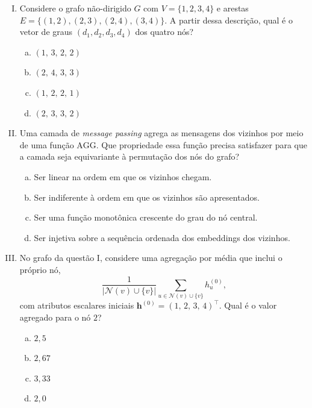 \documentclass{dlproblemset}
\begin{document}
\begin{enumerate}[I)]

    \item Considere o grafo não-dirigido $G$ com $V = \{1,2,3,4\}$ e arestas $E = \{(1,2),(2,3),(2,4),(3,4)\}$. A partir dessa descrição, qual é o vetor de graus $(d_1, d_2, d_3, d_4)$ dos quatro nós?
    \begin{enumerate}[(a)]
        \item $(1,\, 3,\, 2,\, 2)$
        \item $(2,\, 4,\, 3,\, 3)$
        \item $(1,\, 2,\, 2,\, 1)$
        \item $(2,\, 3,\, 3,\, 2)$
    \end{enumerate}

    \item Uma camada de \textit{message passing} agrega as mensagens dos vizinhos por meio de uma função $\mathrm{AGG}$. Que propriedade essa função precisa satisfazer para que a camada seja equivariante à permutação dos nós do grafo?
    \begin{enumerate}[(a)]
        \item Ser linear na ordem em que os vizinhos chegam.
        \item Ser indiferente à ordem em que os vizinhos são apresentados.
        \item Ser uma função monotônica crescente do grau do nó central.
        \item Ser injetiva sobre a sequência ordenada dos embeddings dos vizinhos.
    \end{enumerate}

    \item No grafo da questão I, considere uma agregação por média que inclui o próprio nó,
    \[
        \frac{1}{|\mathcal{N}(v) \cup \{v\}|}\sum_{u \in \mathcal{N}(v) \cup \{v\}} h^{(0)}_u,
    \]
    com atributos escalares iniciais $\mathbf{h}^{(0)} = (1,\, 2,\, 3,\, 4)^\top$. Qual é o valor agregado para o nó $2$?
    \begin{enumerate}[(a)]
        \item $2{,}5$
        \item $2{,}67$
        \item $3{,}33$
        \item $2{,}0$
    \end{enumerate}


\end{enumerate}
\end{document}
